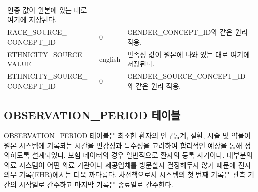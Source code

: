 \documentclass[11pt]{book}
\theoremstyle{definition}
\theoremstyle{definition}
\theoremstyle{definition}
\theoremstyle{remark}
\begin{document}
\begin{longtable}[]{@{}lll@{}}
\begin{minipage}[t]{0.48\columnwidth}
인종 값이 원본에 있는 대로 여기에 저장된다.\strut
\end{minipage}\tabularnewline
\begin{minipage}[t]{0.28\columnwidth}\raggedright\strut
RACE\_SOURCE\_ CONCEPT\_ID\strut
\end{minipage} & \begin{minipage}[t]{0.16\columnwidth}\raggedright\strut
0\strut
\end{minipage} & \begin{minipage}[t]{0.48\columnwidth}\raggedright\strut
GENDER\_CONCEPT\_ID와 같은 원리 적용.\strut
\end{minipage}\tabularnewline
\begin{minipage}[t]{0.28\columnwidth}\raggedright\strut
ETHNICITY\_SOURCE\_ VALUE\strut
\end{minipage} & \begin{minipage}[t]{0.16\columnwidth}\raggedright\strut
english\strut
\end{minipage} & \begin{minipage}[t]{0.48\columnwidth}\raggedright\strut
민족성 값이 원본에 나와 있는 대로 여기에 저장된다.\strut
\end{minipage}\tabularnewline
\begin{minipage}[t]{0.28\columnwidth}\raggedright\strut
ETHNICITY\_SOURCE\_ CONCEPT\_ID\strut
\end{minipage} & \begin{minipage}[t]{0.16\columnwidth}\raggedright\strut
0\strut
\end{minipage} & \begin{minipage}[t]{0.48\columnwidth}\raggedright\strut
GENDER\_SOURCE\_CONCEPT\_ID와 같은 원리 적용.\strut
\end{minipage}\tabularnewline
\bottomrule
\end{longtable}

\subsection{OBSERVATION\_PERIOD 테이블}\label{observationPeriod}

OBSERVATION\_PERIOD 테이블은 최소한 환자의 인구통계, 질환, 시술 및
약물이 원본 시스템에 기록되는 시간을 민감성과 특수성을 고려하여 합리적인
예상을 통해 정의하도록 설계되었다. 보험 데이터의 경우 일반적으로 환자의
등록 시기이다. 대부분의 의료 시스템이 어떤 의료 기관이나 제공업체를
방문할지 결정해두지 않기 때문에 전자 의무 기록(EHR)에서는 더욱 까다롭다.
차선책으로서 시스템의 첫 번째 기록은 관측 기간의 시작일로 간주하고
마지막 기록은 종료일로 간주한다.
\end{document}
